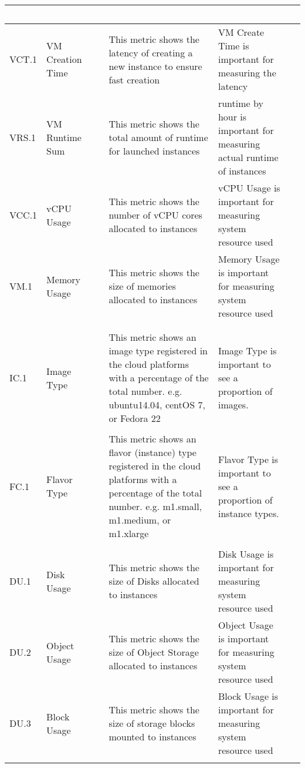 \begin{table*}[p]
\begin{scriptsize}
\begin{center}
\begin{tabular}{lp{}p{}p{}p{}p{}}
~ \\
\hline
VCT.1 &
VM Creation Time &
~&
This metric shows the latency of creating a new instance to ensure fast creation &
VM Create Time is important for measuring the latency &
~ \\
\hline
VRS.1&
VM Runtime Sum&
~&
This metric shows the total amount of runtime for launched instances &
runtime by hour is important for measuring actual runtime of instances &
~ \\
\hline
VCC.1 &
vCPU Usage &
~&
This metric shows the number of vCPU cores allocated to instances &
vCPU Usage is important for measuring system resource used &
~ \\
\hline
VM.1 &
Memory Usage &
~&
This metric shows the size of memories allocated to instances &
Memory Usage is important for measuring system resource used &
~ \\
& & & & & \\
\hline
\rowcolor{blue!20} \multicolumn{6}{l}{\bf Image related metrics} \\
\hline
IC.1 &
Image Type &
~ &
This metric shows an image type registered in the cloud platforms with a
percentage of the total number. e.g. ubuntu14.04, centOS 7, or Fedora 22 & 
Image Type is important to see a proportion of images. & 
~\\
\hline
\rowcolor{blue!20} \multicolumn{6}{l}{\bf Flavor related metrics} \\
\hline
FC.1 &
Flavor Type &
~ &
This metric shows an flavor (instance) type registered in the cloud platforms with a
percentage of the total number. e.g. m1.small, m1.medium, or m1.xlarge & 
Flavor Type is important to see a proportion of instance types. & 
~\\
\hline
\rowcolor{blue!20} \multicolumn{6}{l}{\bf Storage related metrics} \\
\hline
DU.1 &
Disk Usage &
~&
This metric shows the size of Disks allocated to instances &
Disk Usage is important for measuring system resource used &
~ \\
\hline
DU.2 &
Object Usage &
~&
This metric shows the size of Object Storage allocated to instances &
Object Usage is important for measuring system resource used &
~ \\
\hline
DU.3 &
Block Usage &
~&
This metric shows the size of storage blocks mounted to instances &
Block Usage is important for measuring system resource used &
~ \\
\hline
\rowcolor{blue!20} \multicolumn{6}{l}{\bf Server related metrics} \\

\end{tabular}
\end{center}
\end{scriptsize}
\end{table*}
